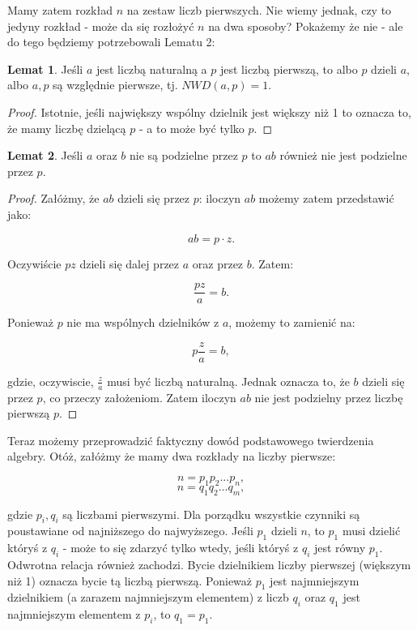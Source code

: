 \documentclass[11pt]{article}
\theoremstyle{definition}
\newtheorem{lemma}{Lemat}
\begin{document}
Mamy zatem rozkład $n$ na zestaw liczb pierwszych. Nie wiemy jednak, czy to jedyny rozkład - może da się rozłożyć $n$ na dwa sposoby? Pokażemy że nie - ale do tego będziemy potrzebowali Lematu 2:

\begin{lemma}
Jeśli $a$ jest liczbą naturalną a $p$ jest liczbą pierwszą, to albo $p$ dzieli $a$, albo $a, p$ są względnie pierwsze, tj. $NWD(a,p)=1$.
\end{lemma}
\begin{proof}
Istotnie, jeśli największy wspólny dzielnik jest większy niż 1 to oznacza to, że mamy liczbę dzielącą $p$ - a to może być tylko $p$.
\end{proof}

\begin{lemma}
Jeśli $a$ oraz $b$ nie są podzielne przez $p$ to $ab$ również nie jest podzielne przez $p$.
\end{lemma}

\begin{proof}
Załóżmy, że $ab$ dzieli się przez $p$: iloczyn $ab$ możemy zatem przedstawić jako:

$$ab = p\cdot z.$$

Oczywiście $pz$ dzieli się dalej przez $a$ oraz przez $b$. Zatem:

$$\frac{pz}{a} = b.$$

Ponieważ $p$ nie ma wspólnych dzielników z $a$, możemy to zamienić na:

$$p\frac{z}{a} = b,$$

gdzie, oczywiscie, $\frac za$ musi być liczbą naturalną. Jednak oznacza to, że $b$ dzieli się przez $p$, co przeczy założeniom. Zatem iloczyn $ab$ nie jest podzielny przez liczbę pierwszą $p$.
\end{proof}


Teraz możemy przeprowadzić faktyczny dowód podstawowego twierdzenia algebry. Otóż, załóżmy że mamy dwa rozkłady na liczby pierwsze:

$$n = p_1p_2...p_n,$$
$$n = q_1q_2...q_m,$$

gdzie $p_i, q_i$ są liczbami pierwszymi. Dla porządku wszystkie czynniki są poustawiane od najniższego do najwyższego. Jeśli $p_1$ dzieli $n$, to $p_1$ musi dzielić któryś z $q_i$ - może to się zdarzyć tylko wtedy, jeśli któryś z $q_i$ jest równy $p_1$. Odwrotna relacja również zachodzi. Bycie dzielnikiem liczby pierwszej (większym niż 1) oznacza bycie tą liczbą pierwszą. Ponieważ $p_1$ jest najmniejszym dzielnikiem (a zarazem najmniejszym elementem) z liczb $q_i$ oraz $q_1$ jest najmniejszym elementem z $p_i$, to $q_1 = p_1$.
\end{document}
